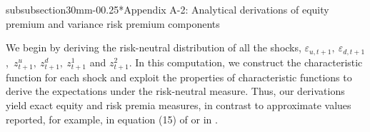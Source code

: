 \documentclass[11pt]{article}
\makeatletter
\renewcommand\subsubsection{\@startsection%
    {subsubsection}{3}{0mm}{-0\baselineskip}{0.25\baselineskip}{\itshape\large}}
\makeatother
\begin{document}
\begin{small}
\subsubsection*{Appendix A-2: Analytical derivations of equity premium and variance risk premium components}

We begin by deriving the risk-neutral distribution of all the shocks, $\varepsilon
_{u,t+1},\ \varepsilon _{d,t+1}$,\ $z_{t+1}^{u},\ z_{t+1}^{d},\ z_{t+1}^{1}$
and $z_{t+1}^{2}.$ In this computation, we construct the characteristic
function for each shock and exploit the properties of characteristic
functions to derive the expectations under the risk-neutral measure. Thus,
our derivations yield exact equity and risk premia measures, in contrast to
approximate values reported, for example, in equation (15) of \cite%
{BolTauchZhou09RFS} or in \cite{DrechslerYaron11RFS}.


\end{small}
\end{document}
